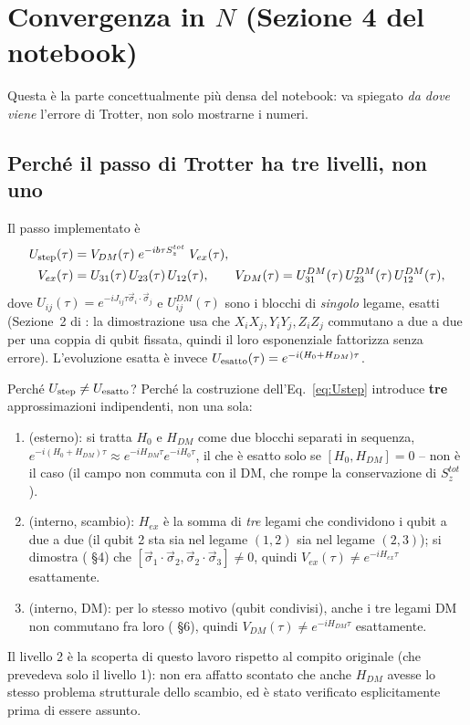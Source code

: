 \documentclass[11pt,a4paper]{article}
\begin{document}
\section{Convergenza in $N$ (Sezione 4 del notebook)}
\label{sec:trotter-error}

Questa è la parte concettualmente più densa del notebook: va spiegato
\emph{da dove viene} l'errore di Trotter, non solo mostrarne i numeri.

\subsection{Perché il passo di Trotter ha tre livelli, non uno}

Il passo implementato è
\begin{align}
U_{\rm step}(\tau) &= V_{DM}(\tau)\;e^{-ib\tau S_z^{tot}}\;V_{ex}(\tau), \label{eq:Ustep}\\
V_{ex}(\tau)&=U_{31}(\tau)\,U_{23}(\tau)\,U_{12}(\tau), \qquad V_{DM}(\tau)=U_{31}^{DM}(\tau)\,U_{23}^{DM}(\tau)\,U_{12}^{DM}(\tau), \notag
\end{align}
dove $U_{ij}(\tau)=e^{-iJ_{ij}\tau\vec\sigma_i\cdot\vec\sigma_j}$ e
$U_{ij}^{DM}(\tau)$ sono i blocchi di \emph{singolo} legame, esatti (Sezione~2
di \texttt{}: la
dimostrazione usa che $X_iX_j,Y_iY_j,Z_iZ_j$ commutano a due a due per una
coppia di qubit fissata, quindi il loro esponenziale fattorizza senza
errore). L'evoluzione esatta è invece $U_{\rm esatto}(\tau)=e^{-i(H_0+H_{DM})\tau}$.

Perché $U_{\rm step}\neq U_{\rm esatto}$? Perché la costruzione
dell'Eq.~\eqref{eq:Ustep} introduce \textbf{tre} approssimazioni
indipendenti, non una sola:
\begin{enumerate}
\item[\textbf{Livello 0}] (esterno): si tratta $H_0$ e $H_{DM}$ come due
blocchi separati in sequenza, $e^{-i(H_0+H_{DM})\tau}\approx
e^{-iH_{DM}\tau}e^{-iH_0\tau}$, il che è esatto solo se $[H_0,H_{DM}]=0$
-- non è il caso (il campo non commuta con il DM, che rompe la
conservazione di $S_z^{tot}$).
\item[\textbf{Livello 1}] (interno, scambio): $H_{ex}$ è la somma di
\emph{tre} legami che condividono i qubit a due a due (il qubit 2 sta sia
nel legame $(1,2)$ sia nel legame $(2,3)$); si dimostra
(\texttt{} \S4)
che $[\vec\sigma_1\!\cdot\!\vec\sigma_2,\vec\sigma_2\!\cdot\!\vec\sigma_3]\neq0$,
quindi $V_{ex}(\tau)\neq e^{-iH_{ex}\tau}$ esattamente.
\item[\textbf{Livello 2}] (interno, DM): per lo stesso motivo (qubit
condivisi), anche i tre legami DM non commutano fra loro
(\texttt{} \S6), quindi
$V_{DM}(\tau)\neq e^{-iH_{DM}\tau}$ esattamente.
\end{enumerate}
Il livello 2 è la scoperta di questo lavoro rispetto al compito
originale (che prevedeva solo il livello 1): non era affatto scontato che
anche $H_{DM}$ avesse lo stesso problema strutturale dello scambio, ed è
stato verificato esplicitamente prima di essere assunto.
\end{document}
